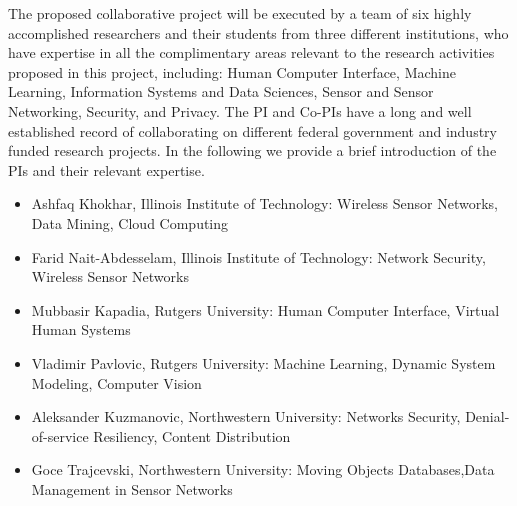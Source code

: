 The proposed collaborative project will be executed by a team of six highly accomplished researchers and their students from three different institutions, who have expertise in all the complimentary areas relevant to the research activities proposed in this project, including: Human Computer Interface, Machine Learning, Information Systems and Data Sciences, Sensor and Sensor Networking, Security, and Privacy. The PI and Co-PIs have a long and well established record of collaborating on different federal government and industry funded  research projects. In the following we provide a brief introduction of the PIs and their relevant expertise.
\begin{itemize}
\vspace{-3mm} \item Ashfaq Khokhar, Illinois Institute of Technology: Wireless Sensor Networks, Data Mining, Cloud Computing
\vspace{-3mm} \item Farid Nait-Abdesselam, Illinois Institute of Technology: Network Security, Wireless Sensor Networks
\vspace{-3mm} \item Mubbasir Kapadia, Rutgers University: Human Computer Interface, Virtual Human Systems
\vspace{-3mm} \item Vladimir Pavlovic, Rutgers University: Machine Learning, Dynamic System Modeling, Computer Vision
\vspace{-3mm} \item Aleksander Kuzmanovic, Northwestern University: Networks Security, Denial-of-service Resiliency, Content Distribution
\vspace{-3mm} \item Goce Trajcevski, Northwestern University: Moving Objects Databases,Data Management in Sensor Networks
\end{itemize}


